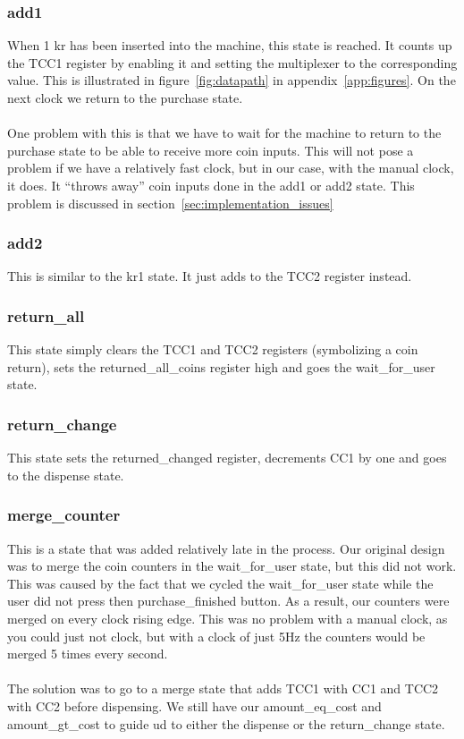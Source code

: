 \subsubsection{add1}
When 1 kr has been inserted into the machine, this state is reached. It counts up the TCC1 register by enabling it and setting the multiplexer to the corresponding value. This is illustrated in figure~\ref{fig:datapath} in appendix~\ref{app:figures}. On the next clock we return to the purchase state.\\
\\
One problem with this is that we have to wait for the machine to return to the purchase state to be able to receive more coin inputs. This will not pose a problem if we have a relatively fast clock, but in our case, with the manual clock, it does. It ``throws away'' coin inputs done in the add1 or add2 state. This problem is discussed in section~\ref{sec:implementation_issues}

\subsubsection{add2}
This is similar to the kr1 state. It just adds to the TCC2 register instead.

\subsubsection{return\_all}
This state simply clears the TCC1 and TCC2 registers (symbolizing a coin return), sets the returned\_all\_coins register high and goes the wait\_for\_user state.

\subsubsection{return\_change}
This state sets the returned\_changed register, decrements CC1 by one and goes to the dispense state.

\subsubsection{merge\_counter}
This is a state that was added relatively late in the process. Our original design was to merge the coin counters in the wait\_for\_user state, but this did not work. This was caused by the fact that we cycled the wait\_for\_user state while the user did not press then purchase\_finished button. As a result, our counters were merged on every clock rising edge. This was no problem with a manual clock, as you could just not clock, but with a clock of just 5Hz the counters would be merged 5 times every second.\\
\\
The solution was to go to a merge state that adds TCC1 with CC1 and TCC2 with CC2 before dispensing. We still have our amount\_eq\_cost and amount\_gt\_cost to guide ud to either the dispense or  the return\_change state.

